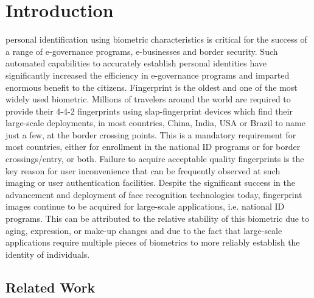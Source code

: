 \hiddenref{}

\section{Introduction\label{introduction}}

 personal identification using biometric characteristics is critical for the success of a range of e-governance programs, e-businesses and border security. Such automated capabilities to accurately establish personal identities have significantly increased the efficiency in e-governance programs and imparted enormous benefit to the citizens. Fingerprint is the oldest and one of the most widely used biometric. Millions of travelers around the world are required to provide their 4-4-2 fingerprints using slap-fingerprint devices which find their large-scale deployments, in most countries, China, India, USA or Brazil to name just a few, at the border crossing points. This is a mandatory requirement for most countries, either for enrollment in the national ID programs or for border crossings/entry, or both. Failure to acquire acceptable quality fingerprints is the key reason for user inconvenience that can be frequently observed at such imaging or user authentication facilities. Despite the significant success in the advancement and deployment of face recognition technologies today, fingerprint images continue to be acquired for large-scale applications, i.e. national ID programs. This can be attributed to the relative stability of this biometric due to aging, expression, or make-up changes and due to the fact that large-scale applications require multiple pieces of biometrics to more reliably establish the identity of individuals.

\subsection{Related Work\label{relate-work}}
